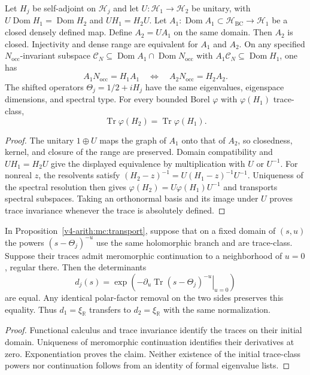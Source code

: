 \begin{proposition}
\label{v4-arith:mc:transport}
Let $H_j$ be self-adjoint on $\mathcal H_j$ and let
$U:\mathcal H_1\to\mathcal H_2$ be unitary, with
$U\operatorname{Dom}H_1=\operatorname{Dom}H_2$ and $UH_1=H_2U$.
Let $A_1:\operatorname{Dom}A_1\subset\mathcal H_{\mathrm{BC}}
\to\mathcal H_1$ be a closed densely defined map. Define
$A_2=UA_1$ on the same domain.
Then $A_2$ is closed. Injectivity and dense range are equivalent
for $A_1$ and $A_2$. On any specified $N_{\mathrm{occ}}$-invariant
subspace $\mathcal C_N\subseteq\operatorname{Dom}A_1\cap
\operatorname{Dom}N_{\mathrm{occ}}$ with
$A_1\mathcal C_N\subseteq\operatorname{Dom}H_1$, one has
\[
 A_1N_{\mathrm{occ}}=H_1A_1
 \quad\Longleftrightarrow\quad
 A_2N_{\mathrm{occ}}=H_2A_2.
\]
The shifted operators $\Theta_j=1/2+iH_j$ have the same eigenvalues,
eigenspace dimensions, and spectral type.
For every bounded Borel $\varphi$ with $\varphi(H_1)$ trace-class,
\[
 \operatorname{Tr}\varphi(H_2)=\operatorname{Tr}\varphi(H_1).
\]
\end{proposition}
\begin{proof}
The unitary $1\oplus U$ maps the graph of $A_1$ onto that of $A_2$,
so closedness, kernel, and closure of the range are preserved.
Domain compatibility and $UH_1=H_2U$ give the displayed equivalence
by multiplication with $U$ or $U^{-1}$.
For nonreal $z$, the resolvents satisfy
$(H_2-z)^{-1}=U(H_1-z)^{-1}U^{-1}$.
Uniqueness of the spectral resolution then gives
$\varphi(H_2)=U\varphi(H_1)U^{-1}$ and transports spectral subspaces.
Taking an orthonormal basis and its image under $U$ proves trace
invariance whenever the trace is absolutely defined.
\end{proof}

\begin{corollary}
\label{v4-arith:mc:determinant}
In Proposition~\ref{v4-arith:mc:transport}, suppose that on a fixed
domain of $(s,u)$ the powers $(s-\Theta_j)^{-u}$ use the same
holomorphic branch and are trace-class. Suppose their traces admit
meromorphic continuation to a neighborhood of $u=0$, regular there.
Then the determinants
\[
 d_j(s)=\exp\left(-\left.\partial_u
          \operatorname{Tr}(s-\Theta_j)^{-u}\right|_{u=0}\right)
\]
are equal. Any identical polar-factor removal on the two sides
preserves this equality. Thus $d_1=\xi_{\mathbb R}$ transfers to
$d_2=\xi_{\mathbb R}$ with the same normalization.
\end{corollary}
\begin{proof}
Functional calculus and trace invariance identify the traces on
their initial domain. Uniqueness of meromorphic continuation
identifies their derivatives at zero. Exponentiation proves the claim.
Neither existence of the initial trace-class powers nor continuation
follows from an identity of formal eigenvalue lists.
\end{proof}

